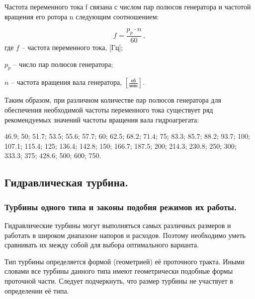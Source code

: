 Частота переменного тока f связана с числом пар полюсов генератора и частотой вращения его ротора n следующим соотношением:

$$
  f = \frac{p_p \cdot n}{60} \, ,
$$
 где $f$ -- частота переменного тока, [Гц];

$p_p$ -- число пар полюсов генератора;

$n$ -- частота вращения вала генератора, $\left[ \frac{\text{об}}{\text{мин}} \right]$.

\vspace{0.5cm}

Таким образом, при различном количестве пар полюсов генератора для обеспечения необходимой частоты переменного тока существует ряд рекомендуемых значений частоты вращения вала гидроагрегата:

\vspace{0.5cm}

\label{riad}

46.9; 50; 51.7; 53.5; 55.6; 57.7; 60; 62.5; 68.2; 71.4; 75; 83.3; 85.7; 88.2; 93.7; 100; 107.1; 115.4; 125; 136.4; 142.8; 150; 166.7; 187.5; 200; 214.3; 230.8; 250; 300; 333.3; 375; 428.6; 500; 600; 750.




\subsection{Гидравлическая турбина.}


\subsubsection[Законы подобия режимов турбин.]{Турбины одного типа и законы подобия режимов их работы.}

Гидравлические турбины могут выполняться самых различных размеров и работать в широком диапазоне напоров и расходов. Поэтому необходимо уметь сравнивать их между собой для выбора оптимального варианта.

Тип турбины определяется формой (геометрией) её проточного тракта. Иными словами все турбины данного типа имеют геометрически подобные формы проточной части. Следует подчеркнуть, что размер турбины не участвует в определении её типа. 

